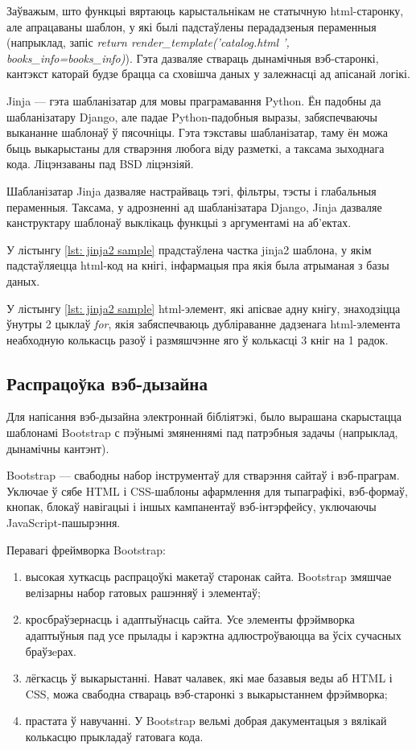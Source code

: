 Заўважым, што функцыі вяртаюць карыстальнікам не статычную html-старонку,
але апрацаваны шаблон, у які былі падстаўлены перададзеныя пераменныя
(напрыклад, запіс \textit{return render\_template('catalog.html ', books\_info=books\_info)}).
Гэта дазваляе ствараць дынамічныя вэб-старонкі, кантэкст каторай будзе брацца са сховішча
даных у залежнасці ад апісанай логікі.

Jinja --- гэта шабланізатар для мовы праграмавання Python. Ён падобны да шабланізатару Django, але падае Python-падобныя выразы, забяспечваючы выкананне шаблонаў ў пясочніцы. Гэта тэкставы шабланізатар, таму ён можа быць выкарыстаны для стварэння любога віду разметкі, а таксама зыходнага кода. Ліцэнзаваны пад BSD ліцэнзіяй.

Шабланізатар Jinja дазваляе настрайваць тэгі, фільтры, тэсты і глабальныя пераменныя. Таксама, у адрозненні ад шабланізатара Django, Jinja дазваляе канструктару шаблонаў выклікаць функцыі з аргументамі на аб'ектах.

У лістынгу \ref{lst: jinja2 sample} прадстаўлена частка jinja2 шаблона, у якім
падстаўляецца html-код на кнігі, інфармацыя пра якія была атрыманая з базы даных.




У лістынгу \ref{lst: jinja2 sample} html-элемент, які апісвае адну кнігу,
знаходзіцца ўнутры 2 цыклаў \textit{for}, якія забяспечваюць дубліраванне
дадзенага html-элемента неабходную колькасць разоў і размяшчэнне яго
ў колькасці 3 кніг на 1 радок.

\subsection{Распрацоўка вэб-дызайна}

Для напісання вэб-дызайна электроннай бібліятэкі, было вырашана скарыстацца шаблонамі Bootstrap с пэўнымі
змяненнямі пад патрэбныя задачы (напрыклад, дынамічны кантэнт).

Bootstrap --- свабодны набор інструментаў для стварэння сайтаў і вэб-праграм. Уключае ў сябе HTML і CSS-шаблоны афармлення для тыпаграфікі, вэб-формаў, кнопак, блокаў навігацыі і іншых кампанентаў вэб-інтэрфейсу, уключаючы JavaScript-пашырэння.

Перавагі фреймворка Bootstrap:
\begin{enumerate}
    \item высокая хуткасць распрацоўкі макетаў старонак сайта. Bootstrap змяшчае велізарны набор гатовых рашэнняў і элементаў;
    \item кросбраўзернасць і адаптыўнасць сайта. Усе элементы фрэймворка адаптыўныя пад усе прылады і карэктна адлюстроўваюцца ва ўсіх сучасных браўзeрах.
    \item лёгкасць ў выкарыстанні. Нават чалавек, які мае базавыя веды аб HTML і CSS, можа свабодна ствараць вэб-старонкі з выкарыстаннем фрэймворка;
    \item прастата ў навучанні. У Bootstrap вельмі добрая дакументацыя з вялікай колькасцю прыкладаў гатовага кода.
\end{enumerate}

